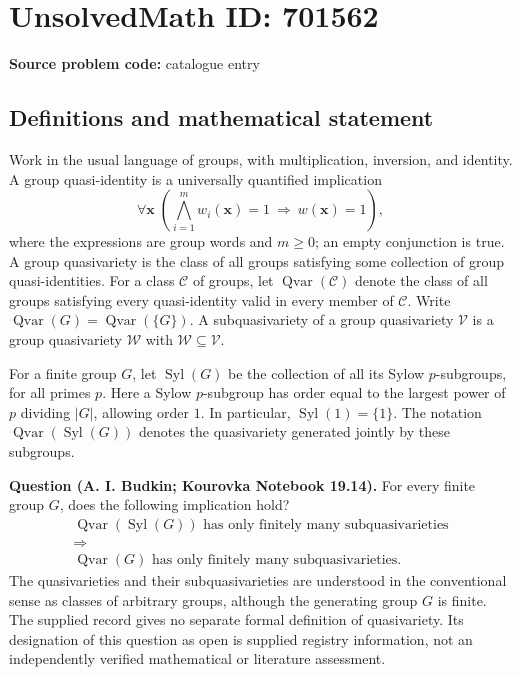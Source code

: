 \documentclass[11pt]{article}
\begin{document}
\section*{UnsolvedMath ID: 701562}
\textbf{Source problem code:} catalogue entry
\subsection{Definitions and mathematical statement}
Work in the usual language of groups, with multiplication, inversion, and identity. A group quasi-identity is a universally quantified implication
\[
\forall \mathbf{x}\;\left(\bigwedge_{i=1}^{m} w_i(\mathbf{x})=1\ \Longrightarrow\ w(\mathbf{x})=1\right),
\]
where the expressions are group words and \(m\geq 0\); an empty conjunction is true. A group quasivariety is the class of all groups satisfying some collection of group quasi-identities. For a class \(\mathcal C\) of groups, let \(\operatorname{Qvar}(\mathcal C)\) denote the class of all groups satisfying every quasi-identity valid in every member of \(\mathcal C\). Write \(\operatorname{Qvar}(G)=\operatorname{Qvar}(\{G\})\). A subquasivariety of a group quasivariety \(\mathcal V\) is a group quasivariety \(\mathcal W\) with \(\mathcal W\subseteq\mathcal V\).

For a finite group \(G\), let \(\operatorname{Syl}(G)\) be the collection of all its Sylow \(p\)-subgroups, for all primes \(p\). Here a Sylow \(p\)-subgroup has order equal to the largest power of \(p\) dividing \(|G|\), allowing order \(1\). In particular, \(\operatorname{Syl}(1)=\{1\}\). The notation \(\operatorname{Qvar}(\operatorname{Syl}(G))\) denotes the quasivariety generated jointly by these subgroups.

\textbf{Question (A. I. Budkin; Kourovka Notebook 19.14).} For every finite group \(G\), does the following implication hold?
\[
\begin{gathered}
\operatorname{Qvar}(\operatorname{Syl}(G))\text{ has only finitely many subquasivarieties}
\\[2pt]
\Longrightarrow
\\[2pt]
\operatorname{Qvar}(G)\text{ has only finitely many subquasivarieties}.
\end{gathered}
\]
The quasivarieties and their subquasivarieties are understood in the conventional sense as classes of arbitrary groups, although the generating group \(G\) is finite. The supplied record gives no separate formal definition of quasivariety. Its designation of this question as open is supplied registry information, not an independently verified mathematical or literature assessment.
\end{document}

